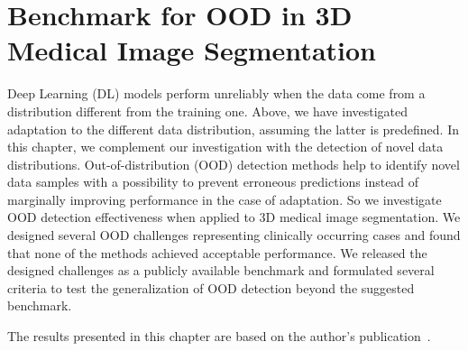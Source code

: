 

\chapter{Benchmark for OOD in 3D Medical Image Segmentation}
\label{chap:ood_bench}


Deep Learning (DL) models perform unreliably when the data come from a distribution different from the training one. Above, we have investigated adaptation to the different data distribution, assuming the latter is predefined. In this chapter, we complement our investigation with the detection of novel data distributions. Out-of-distribution (OOD) detection methods help to identify novel data samples with a possibility to prevent erroneous predictions instead of marginally improving performance in the case of adaptation. So we investigate OOD detection effectiveness when applied to 3D medical image segmentation. We designed several OOD challenges representing clinically occurring cases and found that none of the methods achieved acceptable performance. We released the designed challenges as a publicly available benchmark and formulated several criteria to test the generalization of OOD detection beyond the suggested benchmark.

The results presented in this chapter are based on the author’s publication~\cite{vasiliuk2023limitations}.




